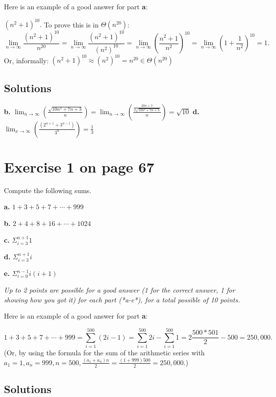 \documentclass[11pt]{article}
\begin{document}
Here is an example of a good answer for part \textbf{a}:

\((n^2 + 1)^{10}.\) To prove this is in \(\Theta(n^{20})\):
\[ \lim_{n \rightarrow \infty} \frac{(n^2 + 1)^{10}}{n^{20}} =
   \lim_{n \rightarrow \infty} \frac{(n^2 + 1)^{10}}{(n^2)^{10}} =
   \lim_{n \rightarrow \infty} \left( \frac{n^2 + 1}{n^2} \right)^{10} =
   \lim_{n \rightarrow \infty} \left( 1 + \frac{1}{n^2} \right)^{10} = 1.
\]
Or, informally: \((n^2 + 1)^{10} \approx (n^2)^{10} = n^{20} \in \Theta(n^{20})\)

\subsection*{Solutions}
\label{sec-4.1}


\textbf{b.} \(\lim_{n\to\infty}\left(\frac{\sqrt{10n^2+7n+3}}{n}\right)=\lim_{n\to\infty}\left(\frac{\frac{20n+7}{2\sqrt{10n^2+7n+3}}}{n}\right)=\sqrt{10}\)
\textbf{d.} \(\lim_{x\to\infty}\left(\frac{\left(2^{n+1}+3^{n-1}\right)}{3^n}\right)=\frac{1}{3}\)

\section*{Exercise 1 on page 67}
\label{sec-5}


Compute the following sums.

\textbf{a.} \(1 + 3 + 5 + 7 + \cdots + 999\)

\textbf{b.} \(2 + 4 + 8 + 16 + \cdots + 1024\)

\textbf{c.} \(\Sigma_{i = 3}^{n + 1} 1\)

\textbf{d.} \(\Sigma_{i = 3}^{n + 1} i\)

\textbf{e.} \(\Sigma_{i = 0}^{n - 1} i(i + 1)\)

\emph{Up to 2 points are possible for a good answer (1 for the correct answer, 1 for showing how you got it) for each part (*a-e*), for a total possible of 10 points.}

Here is an example of a good answer for part \textbf{a}:

\[ 1 + 3 + 5 + 7 + \cdots + 999 = \sum_{i = 1}^{500} (2i - 1) = \sum_{i = 1}^{500} 2i - \sum_{i = 1}^{500} 1
= 2 \frac{500 * 501}{2} - 500 = 250,000.
\]
(Or, by using the formula for the sum of the arithmetic series with \(a_1 = 1, a_n = 999, n = 500, \frac{(a_1 + a_n)n}{2} =
\frac{(1 + 999)500}{2} = 250,000\).)

\subsection*{Solutions}
\label{sec-5.1}
\end{document}
